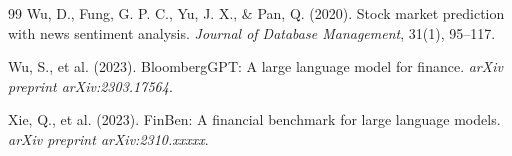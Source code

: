 \documentclass[11pt,a4paper]{article}
\begin{document}
\begin{thebibliography}{99}
Wu, D., Fung, G. P. C., Yu, J. X., \& Pan, Q. (2020).
Stock market prediction with news sentiment analysis.
\textit{Journal of Database Management}, 31(1), 95--117.

Wu, S., et al. (2023).
BloombergGPT: A large language model for finance.
\textit{arXiv preprint arXiv:2303.17564}.

Xie, Q., et al. (2023).
FinBen: A financial benchmark for large language models.
\textit{arXiv preprint arXiv:2310.xxxxx}.

\end{thebibliography}
\end{document}
